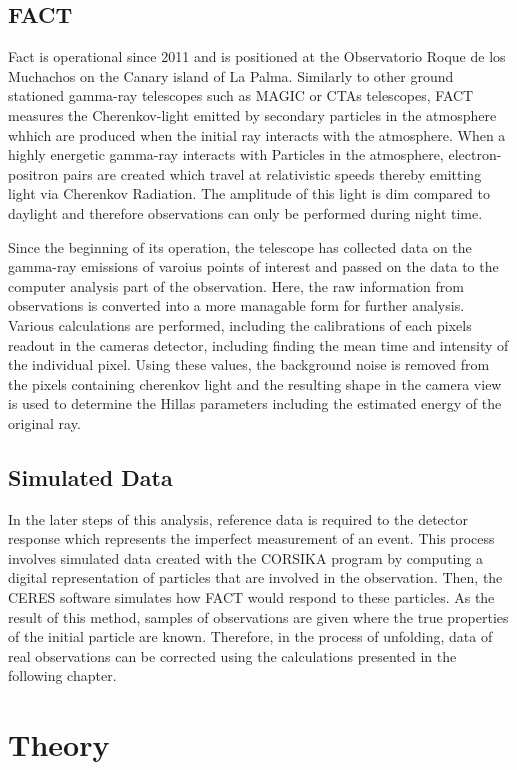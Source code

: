 \subsection{FACT}
Fact is operational since 2011 and is positioned at the Observatorio Roque de los Muchachos on the Canary island of La Palma.    
Similarly to other ground stationed gamma-ray telescopes such as MAGIC or CTAs telescopes, FACT measures the Cherenkov-light emitted by secondary particles in the atmosphere whhich are produced when the initial ray interacts with the atmosphere.
When a highly energetic gamma-ray interacts with Particles in the atmosphere, electron-positron pairs are created which travel at relativistic speeds thereby emitting light via Cherenkov Radiation.
The amplitude of this light is dim compared to daylight and therefore observations can only be performed during night time.

Since the beginning of its operation, the telescope has collected data on the gamma-ray emissions of varoius points of interest and passed on the data to the computer analysis part of the observation.
Here, the raw information from observations is converted into a more managable form for further analysis.
Various calculations are performed, including the calibrations of each pixels readout in the cameras detector, including finding the mean time and intensity of the individual pixel.
Using these values, the background noise is removed from the pixels containing cherenkov light and the resulting shape in the camera view is used to determine the Hillas parameters including the estimated energy of the original ray.

\subsection{Simulated Data}
In the later steps of this analysis, reference data is required to the detector response which represents the imperfect measurement of an event.
This process involves simulated data created with the CORSIKA program \cite{corsika} by computing a digital representation of particles that are involved in the observation.
Then, the CERES software simulates how FACT would respond to these particles.
As the result of this method, samples of observations are given where the true properties of the initial particle are known.
Therefore, in the process of unfolding, data of real observations can be corrected using the calculations presented in the following chapter. 
    \section{Theory}

